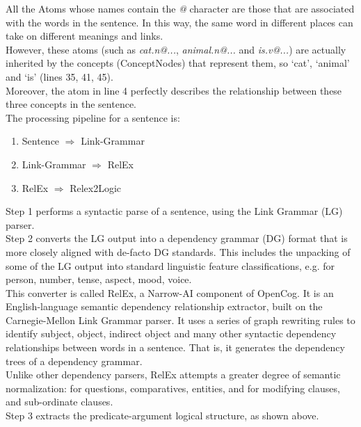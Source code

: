 All the Atoms whose names contain the \textit{@} character are those that are associated with the words in the sentence. In this way, the same word in different places can take on different meanings and links. \\
However, these atoms (such as \textit{cat.n@...}, \textit{animal.n@...} and \textit{is.v@...}) are actually inherited by the concepts (ConceptNodes) that represent them, so `cat', `animal' and `is' (lines 35, 41, 45). \\ 
Moreover, the atom in line 4 perfectly describes the relationship between these three concepts in the sentence. \\

The processing pipeline for a sentence is: 
\begin{enumerate}
	\item Sentence $\Rightarrow$ Link-Grammar
	\item Link-Grammar $\Rightarrow$ RelEx
	\item RelEx $\Rightarrow$ Relex2Logic
\end{enumerate}

Step 1 performs a syntactic parse of a sentence, using the Link Grammar (LG) parser. \\

Step 2 converts the LG output into a dependency grammar (DG) format that is more closely aligned with de-facto DG standards. This includes the unpacking of some of the LG output into standard linguistic feature classifications, e.g. for person, number, tense, aspect, mood, voice. \\
This converter is called RelEx, a Narrow-AI component of OpenCog. It is an English-language semantic dependency relationship extractor, built on the Carnegie-Mellon Link Grammar parser. It uses a series of graph rewriting rules to identify subject, object, indirect object and many other syntactic dependency relationships between words in a sentence. That is, it generates the dependency trees of a dependency grammar. \\
Unlike other dependency parsers, RelEx attempts a greater degree of semantic normalization: for questions, comparatives, entities, and for modifying clauses, and sub-ordinate clauses. \\

Step 3 extracts the predicate-argument logical structure, as shown above.
